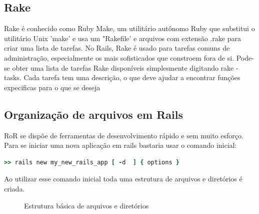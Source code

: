 \subsection{Rake}
Rake é conhecido como Ruby Make, um utilitário autônomo Ruby que substitui o utilitário Unix 'make'
e usa um "Rakefile' e arquivos com extensão .rake para criar uma lista de tarefas. No Rails, Rake é
usado para tarefas comuns de administração, especialmente os mais sofisticados que constroem fora de si.
Pode-se obter uma lista de tarefas Rake disponíveis simplesmente digitando rake - tasks.
Cada tarefa tem uma descrição, o que deve ajudar a encontrar funções expecificas para o que se deseja

\subsection{Organização de arquivos em Rails}
RoR se dispõe de ferramentas de desenvolvimento rápido e sem muito esforço. Para se iniciar uma nova aplicação em rails
bastaria usar o comando inicial:

{\singlespace
\begin{lstlisting}[caption=Exemplo de uso de scaffold, language=Ruby,label={scaffold}]
  >> rails new my_new_rails_app [ -d  ] { options }
\end{lstlisting}
}

Ao utilizar esse comando inicial toda uma estrutura de arquivos e diretórios é criada. 

\begin{figure}[ht]
    \centering
    \caption{Estrutura básica de arquivos e diretórios}
    \label{submeter}
\end{figure}

